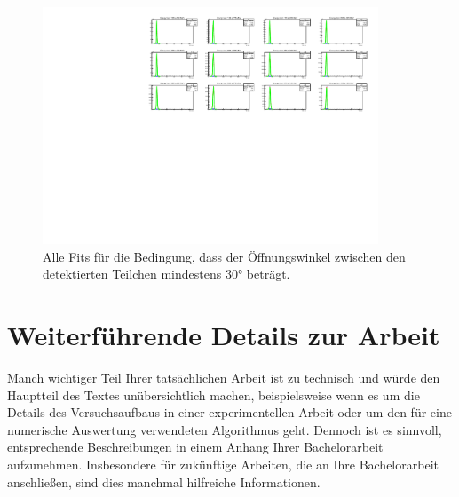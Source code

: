 \documentclass[a4paper,11pt,oneside,final,german,openbib,pdftex]{scrbook}
\begin{document}
{\begin{appendix}
\begin{figure}
	\begin{center}
		\includegraphics[width=100mm]{20171804MinOpeningAngleAllFits}
		\caption{Alle Fits f\"ur die Bedingung, dass der \"Offnungswinkel zwischen den detektierten Teilchen mindestens 30° betr\"agt. }
	\end{center}
\end{figure}


\section{Weiterf\"uhrende Details zur Arbeit}

Manch wichtiger Teil Ihrer tats\"achlichen Arbeit ist zu technisch 
und w\"urde den Hauptteil des Textes un\"ubersichtlich machen, 
beispielsweise wenn es um die Details des Versuchsaufbaus in einer 
experimentellen Arbeit oder um den f\"ur eine numerische Auswertung 
verwendeten Algorithmus geht. Dennoch ist es sinnvoll, entsprechende 
Beschreibungen in einem Anhang Ihrer Bachelorarbeit aufzunehmen. 
Insbesondere f\"ur zuk\"unftige Arbeiten, die an Ihre Bachelorarbeit 
anschlie{\ss}en, sind dies manchmal hilfreiche Informationen.






\end{appendix}}
\end{document}
